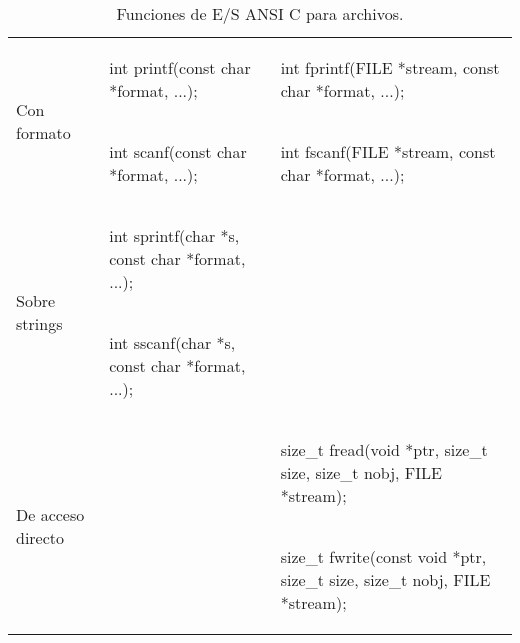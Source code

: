 \begin{table}[hbtp]
\begin{tabular}{l|l|l}
    \hline	
\multirow{2}{*}{Con formato}  	& 
\begin{codecell}
int printf(const 
char *format, ...);
\end{codecell}
	& 
\begin{codecell}
int fprintf(FILE *stream, 
const char *format, ...);
\end{codecell}
\\
    								&  
\begin{codecell}
int scanf(const 
char *format, ...);
\end{codecell}
   & 
\begin{codecell}
int fscanf(FILE *stream, 
const char *format, ...);
\end{codecell}
  \\
    \hline
\multirow{2}{*}{Sobre strings}  	& 
\begin{codecell}
int sprintf(char *s, const 
char *format, ...);
\end{codecell}
	&  \\
    								&   
\begin{codecell}
int sscanf(char *s, const 
char *format, ...);
\end{codecell}
   &    \\
    \hline
\multirow{2}{*}{De acceso directo}  	& 	& 
\begin{codecell}
size_t fread(void *ptr, size_t 
size, size_t nobj, FILE *stream);
\end{codecell}
\\
    								&      &  
\begin{codecell}
size_t fwrite(const void *ptr, 
size_t size, size_t nobj, 
FILE *stream);
\end{codecell}
\\
\end{tabular}
\caption{Funciones de E/S ANSI C para archivos.}
\label{tab:resumenesansicarchivos}
\end{table}

